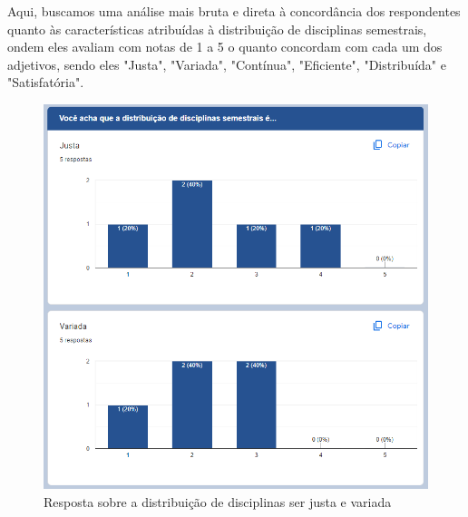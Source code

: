         Aqui, buscamos uma análise mais bruta e direta à concordância dos respondentes quanto às características atribuídas à distribuição de disciplinas semestrais, ondem eles avaliam com notas de 1 a 5 o quanto concordam com cada um dos adjetivos, sendo eles "Justa", "Variada", "Contínua", "Eficiente", "Distribuída" e "Satisfatória".

        \begin{figure}[htbp]\centering
            \caption{\label{fig:5.1_Opiniao} Resposta sobre a distribuição de disciplinas ser justa e variada}
            \includegraphics[scale=0.8]{files/img/forms/5.1-Opiniao-JustaVariada.png}
        \end{figure} %
